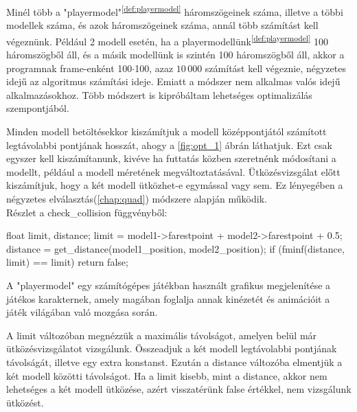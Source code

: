 
Minél több a "playermodel"\textsuperscript{\ref{def:playermodel}} háromszögeinek száma, illetve a többi modellek száma, és azok háromszögeinek száma, annál több számítást kell végeznünk. Például 2 modell esetén, ha a playermodellünk\textsuperscript{\ref{def:playermodel}} 100 háromszögből áll, és a másik modellünk is szintén 100 háromszögből áll, akkor a programnak frame-enként 100$\cdot$100, azaz $10\,000$ számítást kell végeznie, négyzetes idejű az algoritmus számítási ideje. Emiatt a módszer nem alkalmas valós idejű alkalmazásokhoz. Több módszert is kipróbáltam lehetséges optimalizálás szempontjából.

Minden modell betöltésekkor kiszámítjuk a modell középpontjától számított legtávolabbi pontjának hosszát, ahogy a \ref{fig:opt_1} ábrán láthatjuk. Ezt csak egyszer kell kiszámítanunk, kivéve ha futtatás közben szeretnénk módosítani a modellt, például a modell méretének megváltoztatásával. Ütközésvizsgálat előtt kiszámítjuk, hogy a két modell ütközhet-e egymással vagy sem. Ez lényegében a négyzetes elválasztás(\ref{chap:quad}) módszere alapján működik.
\\
Részlet a check\_collision függvényből:
\begin{cpp}
float limit, distance;
limit = model1->farestpoint + model2->farestpoint + 0.5;
distance = get_distance(model1_position, model2_position);
if (fminf(distance, limit) == limit)
{
    return false;
}
\end{cpp}

\vfill
\begin{definition}[Playermodel]
	A "playermodel" egy számítógépes játékban használt grafikus megjelenítése a játékos karakternek, amely magában foglalja annak kinézetét és animációit a játék világában való mozgása során.
	\label{def:playermodel}
\end{definition}
\newpage
A limit változóban megnézzük a maximális távolságot, amelyen belül már ütközésvizsgálatot vizsgálunk. Összeadjuk a két modell legtávolabbi pontjának távolságát, illetve egy extra konstanst. Ezután a distance változóba elmentjük a két modell közötti távolságot. Ha a limit kisebb, mint a distance, akkor nem lehetséges a két modell ütközése, azért visszatérünk false értékkel, nem vizsgálunk ütközést.

